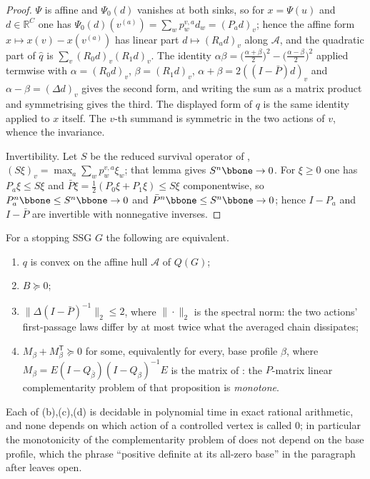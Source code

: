 \begin{proof}
$\Psi$ is affine and $\Psi_0(d)$ vanishes at both sinks, so for $x=\Psi(u)$
and $d\in\mathbb R^{C}$ one has
$\Psi_0(d)(v^{(a)})=\sum_wp^{v,a}_wd_w=(P_ad)_v$; hence the affine form
$x\mapsto x(v)-x(v^{(a)})$ has linear part $d\mapsto(R_ad)_v$ along
$\mathcal A$, and the quadratic part of $\widehat q$ is
$\sum_v(R_0d)_v(R_1d)_v$. The identity
$\alpha\beta=\bigl(\tfrac{\alpha+\beta}2\bigr)^{2}
-\bigl(\tfrac{\alpha-\beta}2\bigr)^{2}$ applied termwise with
$\alpha=(R_0d)_v$, $\beta=(R_1d)_v$, $\alpha+\beta=2((I-\bar P)d)_v$ and
$\alpha-\beta=(\Delta d)_v$ gives the second form, and writing the sum as a
matrix product and symmetrising gives the third. The displayed form of $q$
is the same identity applied to $x$ itself. The $v$-th summand is symmetric
in the two actions of $v$, whence the invariance.

Invertibility. Let $S$ be the reduced survival operator of
, $(S\xi)_v=\max_a\sum_wp^{v,a}_w\xi_w$; that
lemma gives $S^{n}\bbone\to0$. For $\xi\ge0$ one has
$P_a\xi\le S\xi$ and $\bar P\xi=\tfrac12(P_0\xi+P_1\xi)\le S\xi$
componentwise, so $P_a^{n}\bbone\le S^{n}\bbone\to0$ and
$\bar P^{n}\bbone\le S^{n}\bbone\to0$; hence $I-P_a$ and $I-\bar P$ are
invertible with nonnegative inverses.
\end{proof}

\begin{theorem}\label{vr:convexity}
For a stopping SSG $G$ the following are equivalent.
\begin{enumerate}[label=(\alph*),leftmargin=2.2em]
\item $q$ is convex on the affine hull $\mathcal A$ of $Q(G)$;
\item $B\succeq0$;
\item $\bigl\|\Delta(I-\bar P)^{-1}\bigr\|_{2}\le2$, where
      $\|\cdot\|_2$ is the spectral norm: the two actions' first-passage
      laws differ by at most twice what the averaged chain dissipates;
\item $M_\beta+M_\beta^{\mathsf T}\succeq0$ for some, equivalently for
      every, base profile $\beta$, where
      $M_\beta=E(I-Q_{\bar\beta})(I-Q_\beta)^{-1}E$ is the matrix of
      : the $P$-matrix linear complementarity problem of
      that proposition is \emph{monotone}.
\end{enumerate}
Each of (b),(c),(d) is decidable in polynomial time in exact rational
arithmetic, and none depends on which action of a controlled vertex is
called $0$; in particular the monotonicity of the complementarity problem
of  does not depend on the base profile, which the phrase
``positive definite at its all-zero base'' in the paragraph after
 leaves open.
\end{theorem}

